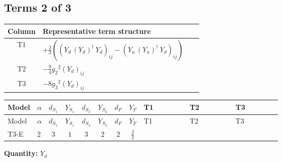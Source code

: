 \documentclass[8pt]{article}
\begin{document}
\begin{landscape}
\subsection*{Terms 2 of 3}
\begin{center}
\begin{tabular}{@{}c >{\raggedright\arraybackslash}p{0.82\linewidth}@{}}
\toprule
Column & Representative term structure \\
\midrule
T1 & \(\displaystyle +\frac{3}{2} (\left({Y_d}\,\left({Y_d}\right)^{\dagger}\,{Y_d}\right)_{ij}-\left({Y_u}\,\left({Y_u}\right)^{\dagger}\,{Y_d}\right)_{ij})\) \\
\midrule
T2 & \(\displaystyle -\frac{9}{4} {g_2}^2 \left({Y_d}\right)_{ij}\) \\
\midrule
T3 & \(\displaystyle -8 {g_3}^2 \left({Y_d}\right)_{ij}\) \\
\midrule
\bottomrule
\end{tabular}
\end{center}
\smallskip
\tiny
\begin{longtable}{@{}llcccccc >{\raggedright\arraybackslash}p{0.21\linewidth} >{\raggedright\arraybackslash}p{0.21\linewidth} >{\raggedright\arraybackslash}p{0.21\linewidth}@{}}
\toprule
Model & $\alpha$ & $d_{S_1}$ & $Y_{S_1}$ & $d_{S_2}$ & $Y_{S_2}$ & $d_F$ & $Y_F$ & T1 & T2 & T3 \\
\midrule
\endfirsthead
\toprule
Model & $\alpha$ & $d_{S_1}$ & $Y_{S_1}$ & $d_{S_2}$ & $Y_{S_2}$ & $d_F$ & $Y_F$ & T1 & T2 & T3 \\
\midrule
\endhead
T3-E & $2$ & $3$ & $1$ & $3$ & $2$ & $2$ & $\frac{3}{2}$ & \scriptsize\adjustbox{max width=\linewidth}{$\begin{gathered} +\frac{3}{2} (\left({Y_d}\,\left({Y_d}\right)^{\dagger}\,{Y_d}\right)_{ij}-\left({Y_u}\,\left({Y_u}\right)^{\dagger}\,{Y_d}\right)_{ij})\end{gathered}$} & \scriptsize\adjustbox{max width=\linewidth}{$\begin{gathered} -\frac{9}{4} {g_2}^2 \left({Y_d}\right)_{ij}\end{gathered}$} & \scriptsize\adjustbox{max width=\linewidth}{$\begin{gathered} -8 {g_3}^2 \left({Y_d}\right)_{ij}\end{gathered}$} \\
\midrule
\bottomrule
\end{longtable}
\clearpage
\noindent\textbf{Quantity: }$Y_d$\par\smallskip

\end{landscape}
\end{document}
